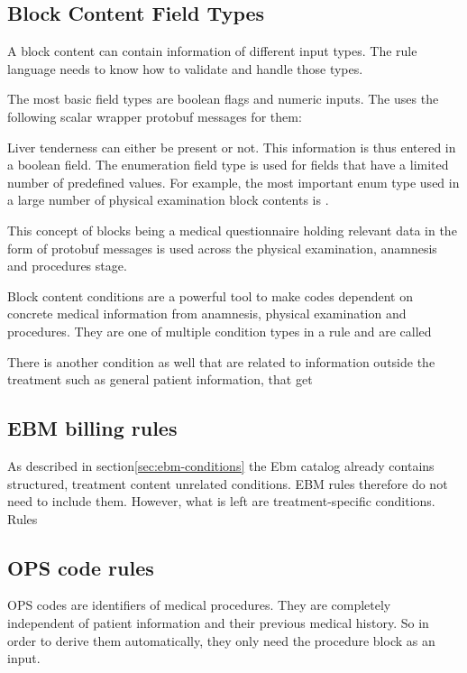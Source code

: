\subsection{Block Content Field Types}
A block content can contain information of different input types.
The rule language needs to know how to validate and handle those types.

The most basic field types are boolean flags and numeric inputs.
The \AV uses the following scalar wrapper protobuf messages for them:




Liver tenderness can either be present or not.
This information is thus entered in a boolean field.
The enumeration field type is used for fields that have a limited number of predefined values.
For example,
the most important enum type
used in a large number of physical examination block contents is .





This concept of blocks being a medical questionnaire
holding relevant data in the form of protobuf messages is used across the physical examination,
anamnesis and procedures stage.


Block content conditions are a powerful tool to make codes dependent on concrete medical information from anamnesis,
physical examination and procedures.
They are one of multiple condition types in a rule and are called 


There is another condition
as well that are related to information outside the treatment such as general patient information,
that get

\subsection{EBM billing rules}\label{subsec:ebm-billing-rules}
As described in section\ref{sec:ebm-conditions} the Ebm catalog already contains structured, treatment content unrelated conditions.
EBM rules therefore do not need to include them.
However, what is left are treatment-specific conditions.
Rules


\subsection{OPS code rules}\label{subsec:ops-code-rules}
OPS codes are identifiers of medical procedures.
They are completely independent of patient information and their previous medical history.
So in order to derive them automatically, they only need the procedure block as an input.

